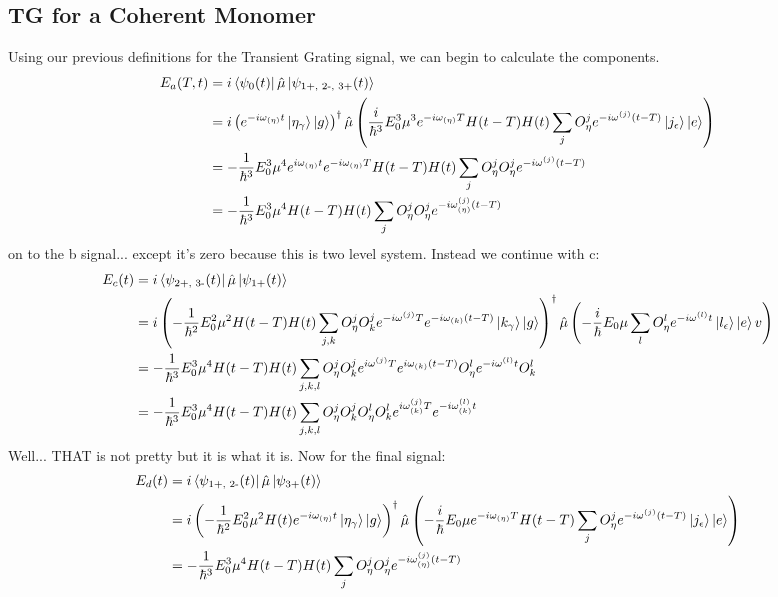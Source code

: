 \subsection{TG for a Coherent Monomer}
Using our previous definitions for the Transient Grating signal, we can begin to calculate the components.
\begin{align}
	E_a (T, t) &= i \bra{\psi_{0} (t)} \hat{\mu} \ket{\psi_{\text{1+, 2-, 3+}} (t)}\\
	&=  i \left( e^{-i \omega_{(\eta)}t} \ket{\eta_{\gamma}} \ket{g}   \right)^{\dagger} \hat{\mu} \left(  \frac{i}{\hbar^3} E^3_0 \mu^3 e^{-i \omega_{(\eta)}T} H(t-T)  H(t) \sum_{j}  O_{\eta}^{j}  e^{-i \omega^{(j)} (t - T) } \ket{j_{\epsilon}} \ket{e}  \right) \\
	&=  -\frac{1}{\hbar^3} E^3_0 \mu^4 e^{i \omega_{(\eta)}t}    e^{-i \omega_{(\eta)}T}   H(t-T) H(t)  \sum_{j}  O_{\eta}^{j} O_{\eta}^{j}  e^{-i \omega^{(j)} (t - T) } \\
	&=  -\frac{1}{\hbar^3} E^3_0 \mu^4  H(t-T)  H(t) \sum_{j}  O_{\eta}^{j} O_{\eta}^{j}  e^{-i \omega^{(j)}_{(\eta)} (t - T) }
\end{align}
on to the b signal... except it's zero because this is two level system.  Instead we continue with c:
\begin{align}
	E_c (t) &=  i \bra{\psi_{\text{2+, 3-}} (t)} \hat{\mu} \ket{\psi_{\text{1+}} (t)}\\
	&=  i \left(   -\frac{1}{\hbar^2} E^2_0 \mu^2 H(t-T) H(t)  \sum_{j, k} O_{\eta}^{j} O_{k}^{j} e^{-i \omega^{(j)} T } e^{-i \omega_{(k)} (t - T) } \ket{k_{\gamma}} \ket{g} \right)^{\dagger} \hat{\mu} \left( -\frac{i}{\hbar} E_0 \mu  \sum_{l} O_{\eta}^{l} e^{-i \omega^{(l)} t } \ket{l_{\epsilon}} \ket{e} v \right) \\
	&=  -\frac{1}{\hbar^3} E^3_0 \mu^4 H(t-T) H(t)  \sum_{j,k,l}O_{\eta}^{j} O_{k}^{j} e^{i \omega^{(j)} T } e^{i \omega_{(k)} (t - T) } O_{\eta}^{l} e^{-i \omega^{(l)} t } O_{k}^{l}\\
	&=  -\frac{1}{\hbar^3} E^3_0 \mu^4 H(t-T)  H(t) \sum_{j,k,l}O_{\eta}^{j} O_{k}^{j} O_{\eta}^{l} O_{k}^{l}  e^{i \omega^{(j)}_{(k)} T }  e^{-i \omega^{(l)}_{(k)} t }
\end{align}
Well... THAT is not pretty but it is what it is.  Now for the final signal:
\begin{align}
	E_d (t)&=  i \bra{\psi_{\text{1+, 2-}} (t)} \hat{\mu} \ket{\psi_{\text{3+}} (t)} \\
	&=  i \left( -\frac{1}{\hbar^2} E^2_0 \mu^2  H(t)  e^{-i \omega_{(\eta)}t}  \ket{\eta_{\gamma}} \ket{g}  \right)^{\dagger} \hat{\mu} \left(  -\frac{i}{\hbar} E_0 \mu  e^{-i \omega_{(\eta)}T} H(t-T) \sum_{j}  O_{\eta}^{j}  e^{-i \omega^{(j)} (t - T) } \ket{j_{\epsilon}} \ket{e} \right) \\
	&=  -\frac{1}{\hbar^3} E^3_0 \mu^4  H(t-T) H(t)  \sum_{j}  O_{\eta}^{j} O_{\eta}^{j}  e^{-i \omega^{(j)}_{(\eta)} (t - T) }
\end{align}




